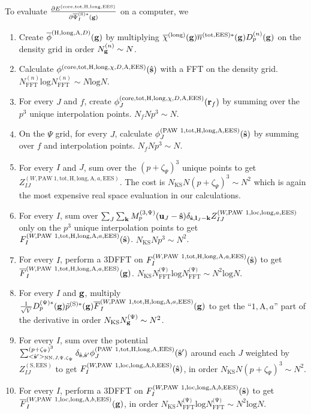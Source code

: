 \documentclass[paper=a4, fontsize=11pt]{article} %
\numberwithin{equation}{section} %
\numberwithin{figure}{section} %
\numberwithin{table}{section} %
\newcommand{\p}{\partial}
\newcommand{\ol}{\overline}
\newcommand{\bu}{{\bf{u}}}
\newcommand{\bl}{{\bf{l}}}
\newcommand{\bk}{{\bf{k}}}
\newcommand{\bs}{{\bf{s}}}
\newcommand{\bg}{{\bf{g}}}
\newcommand{\br}{{\bf{r}}}
\newcommand{\hs}{{\hat{\bf{s}}}}
\newcommand{\rS}{{\mathrm{S}}}
\newcommand{\rEES}{{\mathrm{EES}}}
\newcommand{\rcore}{{\mathrm{core}}}
\newcommand{\rNN}{{\mathrm{NN}}}
\newcommand{\rlong}{{\mathrm{long}}}
\newcommand{\rP}{{\mathrm{PAW}}}
\newcommand{\rH}{{\mathrm{H}}}
\newcommand{\rA}{{\mathrm{A}}}
\newcommand{\rlo}{{\mathrm{loc}}}
\newcommand{\rl}{{\mathrm{log}}}
\newcommand{\rtot}{{\mathrm{tot}}}
\newcommand{\psigsc}{{\overline \Psi_I^{(\rS)*}(\bg)}}
\newcommand{\NKS}{{N_{\mathrm{KS}}}}
\newcommand{\NFFTn}{{N^{(n)}_{\mathrm{FFT}}}}
\newcommand{\NFFTp}{{N^{\mathrm{(\Psi})}_{\mathrm{FFT}}}}
\newcommand{\NgKS}{{N^{\mathrm{(\Psi})}_\bg}}
\newcommand{\Ngn}{{N^{(n)}_\bg}}
\newcommand{\Dpgc}{{D^{(\Psi)*}_p(\bg)}}
\newcommand{\Mp}{{M_p^{(3,\Psi)}}}
\newcommand{\pzp}{{(p+\zeta_{\Psi})^3}}
\newcommand{\hspJp}{{<\hs'>_{\rNN,J,\Psi,\zeta_\Psi}}}
\begin{document}
To evaluate $\frac{\p E^{(\rcore,\rtot,\rH,\rlong,\rEES)}}{\p \psigsc}$ on a computer, we
\begin{enumerate}
\item Create $\ol \phi^{(\rH,\rlong,\rA,D)}(\bg)$ by multiplying $\ol \chi^{(\rlong)}(\bg)  \ol n^{(\rtot,\rEES)*}(\bg) D_p^{(n)}(\bg)$ on the density grid in order $\Ngn \sim N$.
\item Calculate $\phi^{(\rcore,\rtot,\rH,\rlong,\chi,D,\rA,\rEES)}(\hs)$ with a FFT on the density grid. $\NFFTn \rl \NFFTn \sim N \rl N$.
\item For every $J$ and $f$, create $\phi_J^{(\rcore,\rtot,\rH,\rlong,\chi,D,\rA,\rEES)}(\br_f)$ by summing over the $p^3$ unique interpolation points. $N_f N p^3 \sim N$.
\item On the $\Psi$ grid, for every $J$, calculate $\phi_J^{(\rP\ 1,\rtot,\rH,\rlong,\rA,\rEES)}(\hs) $ by summing over $f$ and interpolation points. $N_f N p^3 \sim N$.
\item For every $I$ and $J$, sum over the $\pzp$ unique points to get $Z_{IJ}^{(W,\rP\ 1,\rtot,\rH,\rlong,\rA,a,\rEES)} $. The cost is $\NKS N \pzp \sim N^2$ which is again the most expensive real space evaluation in our calculations.
\item For every $I$, sum over $\sum_J \sum_{\bk} \Mp(\bu_{J}-\hat \bs) \delta_{\hat \bs,\bl_J-\bk}Z_{IJ}^{(W,\rP\ 1,\rlo,\rlong,a,\rEES)}$ only on the $p^3$ unique interpolation points to get $F_I^{(W,\rP\ 1,\rtot,\rH,\rlong,\rA,a,\rEES)}(\hs)$. $\NKS N p^3 \sim N^2$.
\item For every $I$, perform a 3DFFT on $F_I^{(W,\rP\ 1,\rtot,\rH,\rlong,\rA,a,\rEES)}(\hs)$ to get $\ol F_I^{(W,\rP\ 1,\rtot,\rH,\rlong,\rA,a,\rEES)}(\bg)$. $\NKS \NFFTp \rl \NFFTp \sim N^2 \rl N$.
\item For every $I$ and $\bg$, multiply $\frac{1}{\sqrt{V}} \Dpgc\tilde p^{(\rS)*}(\bg) \ol F_I^{(W,\rP\ 1,\rtot,\rH,\rlong,\rA,a,\rEES)}(\bg)$ to get the ``$1,\rA,a$'' part of the derivative in order $\NKS \NgKS \sim N^2$.
\item For every $I$, sum over the potential $\sum_{\hspJp}^\pzp  \delta_{\hs,\hs'} \phi_J^{(\rP\ 1,\rtot,\rH,\rlong,\rA,\rEES)}(\hs')$ around each $J$  weighted by $Z_{IJ}^{(\rS,\rEES)}$ to get $F_I^{(W,\rP\ 1,\rlo,\rlong,\rA,b,\rEES)}(\hs)$, in order $\NKS N \pzp \sim N^2$.
\item For every $I$, perform a 3DFFT on $F_I^{(W,\rP\ 1,\rlo,\rlong,\rA,b,\rEES)}(\hs)$ to get $\ol F_I^{(W,\rP\ 1,\rlo,\rlong,\rA,b,\rEES)}(\bg)$, in order $\NKS \NFFTp \rl \NFFTp \sim N^2 \rl N$.

\end{enumerate}
\end{document}

